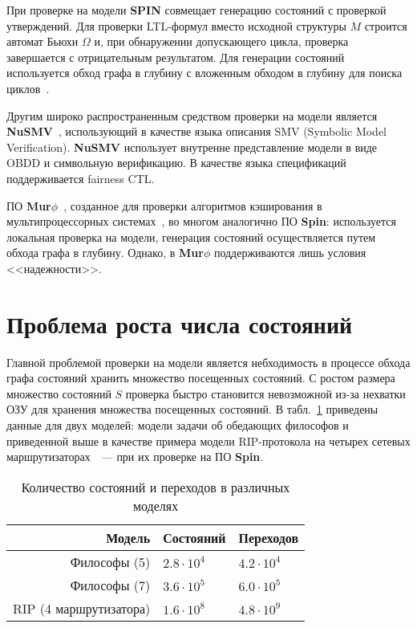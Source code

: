 \documentclass[a4paper,notitlepage,14pt]{article}
\begin{document}
При проверке на модели \textbf{SPIN} совмещает генерацию состояний с проверкой
утверждений. Для проверки LTL-формул вместо исходной структуры $M$ строится автомат Бьюхи
$\Omega$ и, при обнаружении допускающего цикла, проверка завершается с отрицательным
результатом. Для генерации состояний используется обход графа в глубину с вложенным
обходом в глубину для поиска циклов~\cite{DBLP:conf/spin/FaragoS09}.

Другим широко распространенным средством проверки на модели является
\textbf{NuSMV}~\cite{Cimatti00nusmv:a}, использующий в качестве языка описания SMV
(Symbolic Model Verification). \textbf{NuSMV} использует внутренне представление модели в
виде OBDD и символьную верификацию. В качестве языка спецификаций поддерживается fairness
CTL.

ПО \textbf{Mur$\phi$}~\cite{Dill96murphi}, созданное для проверки алгоритмов кэширования в
мультипроцессорных системах~\cite{Dill96murphi}, во многом аналогично ПО \textbf{Spin}:
используется локальная проверка на модели, генерация состояний осуществляется путем обхода
графа в глубину. Однако, в \textbf{Mur$\phi$} поддерживаются лишь условия <<надежности>>.


\section{Проблема роста числа состояний}
\label{sec:state-explosion}

Главной проблемой проверки на модели является небходимость в процессе обхода графа
состояний хранить множество посещенных состояний. С ростом размера множество состояний $S$
проверка быстро становится невозможной из-за нехватки ОЗУ для хранения множества
посещенных состояний. В табл.~\ref{tab:models-statecount} приведены данные для двух
моделей: модели задачи об обедающих философов и приведенной выше в качестве примера модели
RIP-протокола на четырех сетевых маршрутизаторах~\cite{RipOnSpin}~--- при их проверке на
ПО \textbf{Spin}.

\begin{table}
  \centering
  \begin{tabular}{|r|l|l|}
    \hline
    Модель                  & Состояний         & Переходов       \\
    \hline
    Философы (5)            & $2.8 \cdot 10^4$  & $4.2 \cdot 10^4$ \\
    Философы (7)            & $3.6 \cdot 10^5$  & $6.0 \cdot 10^5$ \\
    RIP (4 маршрутизатора)  & $1.6 \cdot 10^8$  & $4.8 \cdot 10^9$ \\
    \hline
  \end{tabular}
  \caption{Количество состояний и переходов в различных моделях}
\label{tab:models-statecount}
\end{table}
\end{document}
